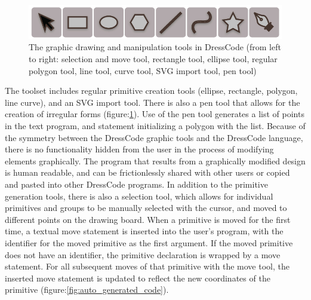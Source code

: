 \documentclass{sigchi}
\begin{document}
\begin{center}
\begin{figure}[h!]
\includegraphics[width=\columnwidth]{images/graphic_tools.jpg}
\caption{The graphic drawing and manipulation tools in DressCode (from left to right: selection and move tool, rectangle tool, ellipse tool, regular polygon tool, line tool, curve tool, SVG import tool, pen tool)}
\label{fig:graphic_tools}
\end{figure}
\end{center}

The toolset includes regular primitive creation tools (ellipse, rectangle, polygon, line curve), and an SVG import tool. There is also a pen tool that allows for the creation of irregular forms (figure:\ref{fig:graphic_tools}). Use of the pen tool generates a list of points in the text program, and statement initializing a polygon with the list. Because of the symmetry between the DressCode graphic tools and the DressCode language, there is no functionality hidden from the user in the process of modifying elements graphically. The program that results from a graphically modified design is human readable, and can be frictionlessly shared with other users or copied and pasted into other DressCode programs. In addition to the primitive generation tools, there is also a selection tool, which allows for individual primitives and groups to be manually selected with the cursor, and moved to different points on the drawing board. When a primitive is moved for the first time, a textual move statement is inserted into the user's program, with the identifier for the moved primitive as the first argument. If the moved primitive does not have an identifier, the primitive declaration is wrapped by a move statement. For all subsequent moves of that primitive with the move tool, the inserted move statement is updated to reflect the new coordinates of the primitive (figure:\ref{fig:auto_generated_code}).
\end{document}
